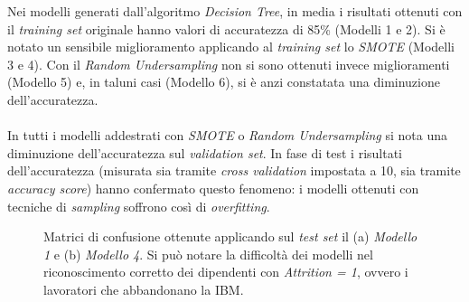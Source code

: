 \noindent Nei modelli generati dall’algoritmo \textit{Decision Tree}, in media i risultati ottenuti con il \textit{training set} originale hanno valori di accuratezza di 85\% (Modelli 1 e 2). Si è notato un sensibile miglioramento applicando al \textit{training set} lo \textit{SMOTE} (Modelli 3 e 4). Con il \textit{Random Undersampling} non si sono ottenuti invece miglioramenti (Modello 5) e, in taluni casi (Modello 6), si è anzi constatata una diminuzione dell’accuratezza.\\\\
In tutti i modelli addestrati con \textit{SMOTE} o \textit{Random Undersampling} si nota una diminuzione dell’accuratezza sul \textit{validation set}. In fase di test i risultati dell’accuratezza (misurata sia tramite \textit{cross validation} impostata a 10, sia tramite \textit{accuracy score}) hanno confermato questo fenomeno: i modelli ottenuti con tecniche di \textit{sampling} soffrono così di \textit{overfitting}.
\begin{figure}[H]
	\centering
	\quad
    \caption{Matrici di confusione ottenute applicando sul \textit{test set} il (a) \textit{Modello 1} e (b)\textit{ Modello 4}. Si può notare la difficoltà dei modelli nel riconoscimento corretto dei dipendenti con \textit{Attrition = 1}, ovvero i lavoratori che abbandonano la IBM.}
	\label{MatriciM1M4}
\end{figure}
